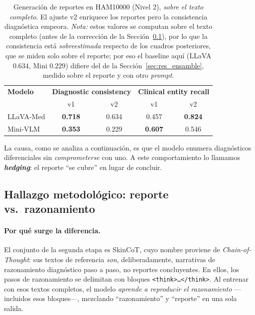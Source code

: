 \documentclass[11pt, a4paper]{article}
\begin{document}
\begin{table}[H]
  \centering
  \caption{Generación de reportes en HAM10000 (Nivel 2), \emph{sobre el texto completo}. El ajuste v2
  enriquece los reportes pero la consistencia diagnóstica empeora. \emph{Nota:} estos valores se computan
  sobre el texto completo (antes de la corrección de la Sección~\ref{sec:reprazon}), por lo que la
  consistencia está \emph{sobreestimada} respecto de los cuadros posteriores, que se miden solo sobre el
  reporte; por eso el baseline aquí (LLaVA $0.634$, Mini $0.229$) difiere del de la
  Sección~\ref{sec:res_ensamble}, medido sobre el reporte y con otro \emph{prompt}.}
  \label{tab:generacion_v1v2}
  \begin{tabular}{lcccc}
    \toprule
    \textbf{Modelo} & \multicolumn{2}{c}{\textbf{Diagnostic consistency}} & \multicolumn{2}{c}{\textbf{Clinical entity recall}} \\
    & v1 & v2 & v1 & v2 \\
    \midrule
    LLaVA-Med & \textbf{0.718} & 0.634 & 0.457 & \textbf{0.824} \\
    Mini-VLM  & \textbf{0.353} & 0.229 & \textbf{0.607} & 0.546 \\
    \bottomrule
  \end{tabular}
\end{table}

La causa, como se analiza a continuación, es que el modelo enumera diagnósticos diferenciales sin
\emph{comprometerse} con uno. A este comportamiento lo llamamos \textbf{\emph{hedging}}: el reporte
``se cubre'' en lugar de concluir.

\subsection{Hallazgo metodológico: reporte vs.\ razonamiento}
\label{sec:reprazon}
\paragraph{Por qué surge la diferencia.} El conjunto de la segunda etapa es SkinCoT, cuyo nombre
proviene de \emph{Chain-of-Thought}: sus textos de referencia \emph{son}, deliberadamente, narrativas de
razonamiento diagnóstico paso a paso, no reportes concluyentes. En ellos, los pasos de razonamiento se
delimitan con bloques \texttt{<think>\dots</think>}. Al entrenar con esos textos completos, el modelo
\emph{aprende a reproducir el razonamiento} —incluidos esos bloques—, mezclando ``razonamiento'' y
``reporte'' en una sola salida.
\end{document}
